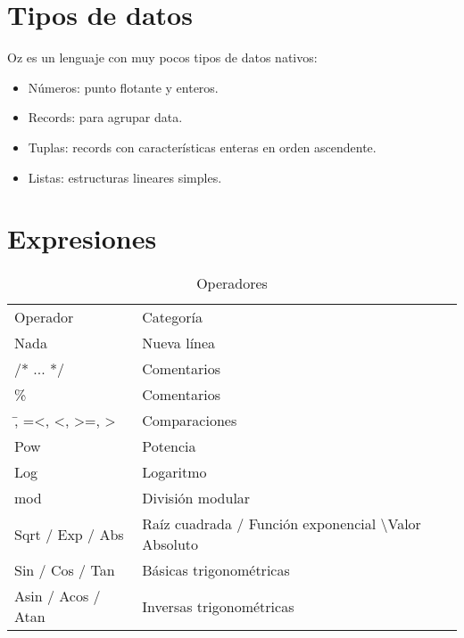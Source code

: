 \documentclass{IEEEtran}
\begin{document}
\section{Tipos de datos}
Oz es un lenguaje con muy pocos tipos de datos nativos:

\begin{itemize}
\item N\'umeros: punto flotante y enteros.
\item Records: para agrupar data.
\item Tuplas: records con caracter\'isticas enteras en orden ascendente.
\item Listas: estructuras lineares simples.
\end{itemize}

\section{Expresiones}
\begin{table}[H]
\centering
\caption{Operadores}
\label{my-label}
\begin{tabular}{ll}
Operador                                               & Categor\'ia                                                           \\
Nada                                                   & Nueva l\'inea                                                         \\
/* ... */                                              & Comentarios                                                           \\
\%                                                     & Comentarios                                                           \\
\=, =\textless, \textless, \textgreater=, \textgreater & Comparaciones                                                         \\
Pow                                                    & Potencia                                                              \\
Log                                                    & Logaritmo                                                             \\
mod                                                    & Divisi\'on modular                                                    \\
Sqrt / Exp / Abs                                       & Ra\'iz cuadrada / Funci\'on exponencial \textbackslash Valor Absoluto \\
Sin / Cos / Tan                                        & B\'asicas trigonom\'etricas                                           \\
Asin / Acos / Atan                                     & Inversas trigonom\'etricas                                           
\end{tabular}
\end{table}
\end{document}
